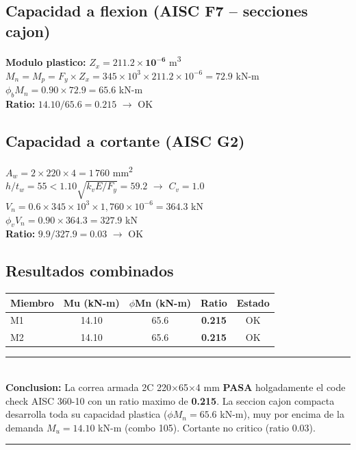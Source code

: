 \documentclass[12pt,a4paper]{article}
\newcommand{\tableheadrow}{\rowcolor{primary!15}\sffamily\footnotesize\bfseries\color{primary}}
\begin{document}
\subsection{Capacidad a flexion (AISC F7 -- secciones cajon)}
{\sffamily\small
\textbf{Modulo plastico:} $Z_x = \mathbf{211.2 \times 10^{-6}}$ m\textsuperscript{3} \\
$M_n = M_p = F_y \times Z_x = 345{\times}10^3 \times 211.2{\times}10^{-6} = \mathbf{72.9}$ kN-m \\
$\phi_b M_n = 0.90 \times 72.9 = \mathbf{65.6}$ kN-m \\
\textbf{Ratio:} $14.10 / 65.6 = \mathbf{0.215}$ $\rightarrow$ \textcolor{secondary!80!black}{OK}
}

\subsection{Capacidad a cortante (AISC G2)}
{\sffamily\small
$A_w = 2 \times 220 \times 4 = 1\,760$ mm\textsuperscript{2} \\
$h/t_w = 55 < 1.10\sqrt{k_v E/F_y} = 59.2$ $\rightarrow$ $C_v = 1.0$ \\
$V_n = 0.6 \times 345{\times}10^3 \times 1{,}760{\times}10^{-6} = 364.3$ kN \\
$\phi_v V_n = 0.90 \times 364.3 = \mathbf{327.9}$ kN \\
\textbf{Ratio:} $9.9 / 327.9 = 0.03$ $\rightarrow$ \textcolor{secondary!80!black}{OK}
}

\subsection{Resultados combinados}
\begin{center}
\begin{tabular}{l c c c c}
\toprule
\tableheadrow
\textbf{Miembro} & \textbf{Mu (kN-m)} & \textbf{$\phi$Mn (kN-m)} & \textbf{Ratio} & \textbf{Estado} \\
\midrule
M1 & 14.10 & 65.6 & \textbf{0.215} & \textcolor{secondary!80!black}{OK} \\
\rowcolor{tablerow}
M2 & 14.10 & 65.6 & \textbf{0.215} & \textcolor{secondary!80!black}{OK} \\
\bottomrule
\end{tabular}
\end{center}

\begin{center}
\begin{minipage}{0.85\textwidth}
\color{primary!80}\sffamily\small
\rule{\textwidth}{0.3pt}\\[4pt]
\textbf{Conclusion:} La correa armada 2C 220$\times$65$\times$4 mm \textbf{PASA} holgadamente
el code check AISC 360-10 con un ratio maximo de \textbf{0.215}. La seccion cajon compacta
desarrolla toda su capacidad plastica ($\phi M_n=65.6$ kN-m), muy por encima de la demanda
$M_u=14.10$ kN-m (combo 105). Cortante no critico (ratio 0.03).\\
\rule{\textwidth}{0.3pt}
\end{minipage}
\end{center}
\end{document}
